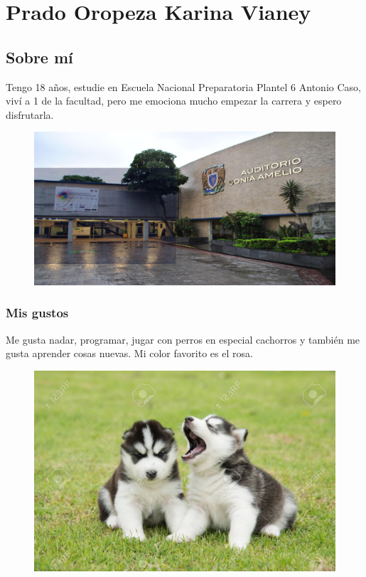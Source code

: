 \chapter{Prado Oropeza Karina Vianey}


\section{Sobre mí}
Tengo 18 años, estudie en Escuela Nacional Preparatoria Plantel 6 Antonio Caso,
viví a 1 de la facultad, pero me emociona mucho empezar la carrera y espero disfrutarla. \LaTex \smiley
\begin{figure}
  \includegraphics[width=\linewidth]{./317133231/prepa.jpg}
\end{figure}

\subsection{Mis gustos}
Me gusta nadar, programar, jugar con perros en especial cachorros y también me gusta aprender cosas nuevas.
Mi color favorito es el rosa.
\begin{figure}
  \includegraphics[width=\linewidth]{./317133231/perritos.jpg}
\end{figure}


